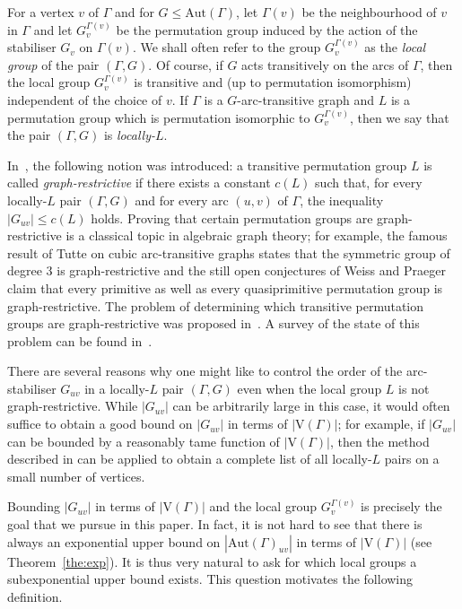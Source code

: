 \documentclass{amsart}
\theoremstyle{definition}
\begin{document}
For a vertex $v$ of $\Gamma$ and for $G\le {\mathrm{Aut}}(\Gamma)$, let $\Gamma(v)$ be the neighbourhood of $v$ in $\Gamma$ and let $G_v^{\Gamma(v)}$ be the permutation group induced by the action of the stabiliser $G_v$ on $\Gamma(v)$. We shall often refer to the group $G_v^{\Gamma(v)}$ as the {\em local group} of the pair $(\Gamma,G)$. Of course, if $G$ acts transitively on the arcs of $\Gamma$, then the local group $G_v^{\Gamma(v)}$ is transitive and (up to permutation isomorphism) independent of the choice of $v$. If $\Gamma$ is a $G$-arc-transitive graph and $L$ is a permutation group which is permutation isomorphic to $G_v^{\Gamma(v)}$, then we say that the pair $(\Gamma,G)$ is {\em locally-$L$}.

In~\cite{Verret}, the following notion was introduced: a transitive permutation group $L$ is called \emph{graph-restrictive} if there exists a constant $c(L)$ such that, for every locally-$L$ pair $(\Gamma,G)$ and for every arc $(u,v)$ of $\Gamma$, the inequality $|G_{uv}|\leq c(L)$ holds. Proving that certain permutation groups are graph-restrictive is a classical topic in algebraic graph theory; for example, the famous result of Tutte on cubic arc-transitive graphs \cite{Tutte,Tutte2} states that the symmetric group of degree $3$ is graph-restrictive and the still open conjectures of Weiss \cite{Weiss} and Praeger \cite{PConj} claim that every primitive as well as every quasiprimitive permutation group is graph-restrictive. The problem of determining which transitive permutation groups are graph-restrictive was proposed in~\cite{Verret}. A survey of the state of this problem can be found in~\cite{PSVRestrictive}.

There are several reasons why one might like to control the order of the arc-stabiliser $G_{uv}$ in a locally-$L$ pair $(\Gamma,G)$ even when the local group $L$ is not graph-restrictive. While $|G_{uv}|$ can be arbitrarily large in this case,  it would often suffice to obtain a good bound on $|G_{uv}|$ in terms of $|{\mathrm V}(\Gamma)|$; for example, if $|G_{uv}|$ can be bounded by a reasonably tame function of $|{\mathrm V}(\Gamma)|$, then the method described in \cite{ConDob} can be applied to obtain a complete list of all locally-$L$ pairs on a small number of vertices.

Bounding $|G_{uv}|$ in terms of $|{\mathrm V}(\Gamma)|$ and the local group $G_v^{\Gamma(v)}$ is precisely the goal that we pursue in this paper. In fact, it is not hard to see that there is always an exponential upper bound  on $|{\mathrm{Aut}}(\Gamma)_{uv}|$ in terms of $|{\mathrm V}(\Gamma)|$ (see Theorem~\ref{the:exp}). It is thus very natural to ask for which local groups a subexponential upper bound exists. This question motivates the following definition.
\end{document}

